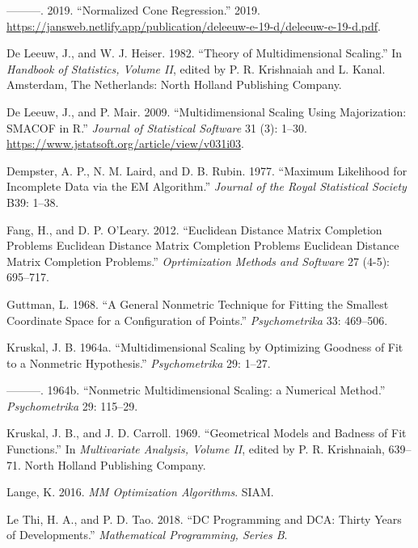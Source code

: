 \documentclass[
  12pt,
]{article}
\newlength{\cslhangindent}
\newenvironment{CSLReferences}[2] %
 {\begin{list}{}{%
  \setlength{\itemindent}{0pt}
  \setlength{\leftmargin}{0pt}
  \setlength{\parsep}{0pt}
  \ifodd #1
   \setlength{\leftmargin}{\cslhangindent}
   \setlength{\itemindent}{-1\cslhangindent}
  \fi
  \setlength{\itemsep}{#2\baselineskip}}}
 {\end{list}}
\begin{document}
\begin{CSLReferences}{1}{0}
---------. 2019. {``Normalized Cone Regression.''} 2019. \url{https://jansweb.netlify.app/publication/deleeuw-e-19-d/deleeuw-e-19-d.pdf}.

De Leeuw, J., and W. J. Heiser. 1982. {``Theory of Multidimensional Scaling.''} In \emph{Handbook of Statistics, Volume {II}}, edited by P. R. Krishnaiah and L. Kanal. Amsterdam, The Netherlands: North Holland Publishing Company.

De Leeuw, J., and P. Mair. 2009. {``{Multidimensional Scaling Using Majorization: SMACOF in R}.''} \emph{Journal of Statistical Software} 31 (3): 1--30. \url{https://www.jstatsoft.org/article/view/v031i03}.

Dempster, A. P., N. M. Laird, and D. B. Rubin. 1977. {``{Maximum Likelihood for Incomplete Data via the EM Algorithm}.''} \emph{Journal of the Royal Statistical Society} B39: 1--38.

Fang, H., and D. P. O'Leary. 2012. {``Euclidean Distance Matrix Completion Problems Euclidean Distance Matrix Completion Problems Euclidean Distance Matrix Completion Problems.''} \emph{Oprtimization Methods and Software} 27 (4-5): 695--717.

Guttman, L. 1968. {``{A General Nonmetric Technique for Fitting the Smallest Coordinate Space for a Configuration of Points}.''} \emph{Psychometrika} 33: 469--506.

Kruskal, J. B. 1964a. {``{Multidimensional Scaling by Optimizing Goodness of Fit to a Nonmetric Hypothesis}.''} \emph{Psychometrika} 29: 1--27.

---------. 1964b. {``{Nonmetric Multidimensional Scaling: a Numerical Method}.''} \emph{Psychometrika} 29: 115--29.

Kruskal, J. B., and J. D. Carroll. 1969. {``{Geometrical Models and Badness of Fit Functions}.''} In \emph{Multivariate Analysis, Volume II}, edited by P. R. Krishnaiah, 639--71. North Holland Publishing Company.

Lange, K. 2016. \emph{MM Optimization Algorithms}. SIAM.

Le Thi, H. A., and P. D. Tao. 2018. {``{DC Programming and DCA: Thirty Years of Developments}.''} \emph{Mathematical Programming, Series B}.


\end{CSLReferences}
\end{document}
